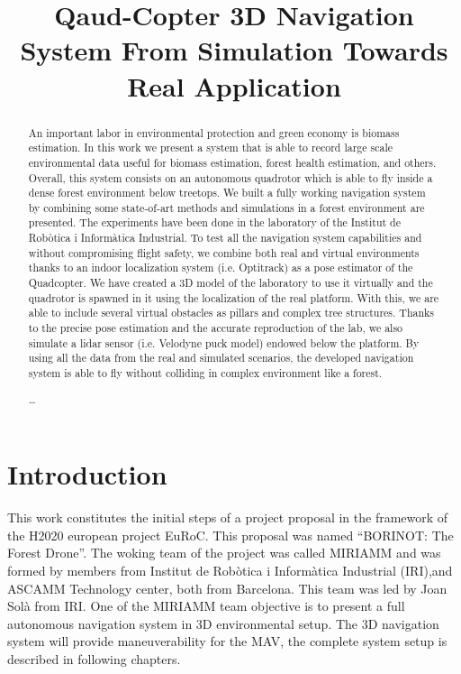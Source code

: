\documentclass[runningheads]{llncs}
\begin{document}
\pagestyle{headings}

\mainmatter

\title{Qaud-Copter 3D Navigation System From Simulation Towards Real Application}


\maketitle

\begin{abstract}
An important labor in environmental protection and green economy is biomass estimation. In this work we present a system that is able to record large scale environmental data useful for biomass estimation, forest health estimation, and others. Overall, this system consists on an autonomous quadrotor which is able to fly inside a dense forest environment below treetops. We built a fully working navigation system by combining some state-of-art methods and  simulations in a forest environment are presented. The experiments have been done in the laboratory of the Institut de Robòtica i Informàtica Industrial. To test all the navigation system capabilities and without compromising flight safety, we combine both real and virtual environments thanks to an indoor localization system (i.e. Optitrack) as a pose estimator of the Quadcopter. We have created a 3D model of the laboratory to use it virtually and the quadrotor is spawned in it using the localization of the real platform. With this, we are able to include  several virtual obstacles as pillars and complex tree structures. Thanks to the precise pose estimation and the accurate reproduction of the lab, we also simulate a lidar sensor (i.e. Velodyne puck model) endowed below the platform.  By using all the data from the real and simulated scenarios, the developed navigation system is able to fly without colliding in complex environment like a forest.

\dots
\end{abstract}


\section{Introduction}
This work constitutes the initial steps of a project proposal in the framework of the H2020 european project EuRoC. This proposal was named “BORINOT: The Forest Drone”. The woking team  of the project was called MIRIAMM and was formed by members from Institut de Robòtica i Informàtica Industrial (IRI),and ASCAMM Technology center, both from Barcelona. This team was led by Joan Solà from IRI. One of the MIRIAMM team objective is to present a full autonomous navigation system in 3D environmental setup. The 3D navigation system will provide maneuverability for the MAV, the complete system setup is described in following chapters.
\end{document}
